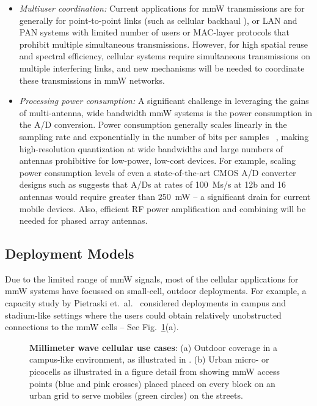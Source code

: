 \documentclass[journal]{IEEEtran}
\begin{document}
\begin{itemize}
\item \emph{Multiuser coordination:}  Current applications for mmW transmissions
are for generally for point-to-point links (such as cellular
backhaul \cite{ChiaGB:09}), or LAN and PAN systems
\cite{PerCPY:10,VauNic:10,Daniels:10,Baykas-WPAN:11} with limited number of users
or MAC-layer protocols that prohibit multiple simultaneous transmissions.
However, for high spatial reuse and spectral efficiency,
cellular systems require simultaneous transmissions on multiple interfering
links, and new mechanisms will be needed to coordinate these transmissions
in mmW networks.

\item \emph{Processing power consumption:}
A significant challenge in leveraging the gains of multi-antenna, wide bandwidth
mmW systems  is the power consumption in the A/D conversion.
Power consumption generally scales linearly in the sampling rate
and exponentially in the number of bits per samples~
\cite{Ted:60Gstate11,ChoEtAl_LowPowerAD:94,murdock2014consumption},
making high-resolution quantization at wide bandwidths and large numbers of
antennas prohibitive for low-power, low-cost devices.
For example, scaling power consumption levels of even a state-of-the-art CMOS A/D converter
designs such as \cite{ChenWHL:11,ParkEtAl:11} suggests that
A/Ds at rates of 100~Ms/s at 12b and 16 antennas would require
greater than 250~mW -- a significant drain for current mobile devices.
Also, efficient RF power amplification and combining will be needed for
phased array antennas.

\end{itemize}


\subsection{Deployment Models} \label{sec:network}

Due to the limited range of mmW signals, most of the cellular applications
for mmW systems have focussed on small-cell, outdoor deployments.
For example, a capacity study by Pietraski et.\ al.\ \cite{PietBRPC:12,abouelseoud2013system} considered
deployments in campus and stadium-like settings where the users could
obtain relatively unobstructed connections to the mmW cells
-- See Fig.~\ref{fig:mmWUseCase}(a).
\begin{figure}
\begin{center}
\end{center}
\caption{\textbf{Millimeter wave cellular use cases}:
(a) Outdoor coverage in a campus-like environment, as illustrated in
 \cite{abouelseoud2013system}. (b) Urban micro- or picocells
as illustrated in a figure detail from \cite{Ghosh-mmw:2013}
showing mmW access points
(blue and pink crosses) placed placed on every block on an urban grid
to serve mobiles (green circles) on the streets.
}
\label{fig:mmWUseCase}
\end{figure}
\end{document}
